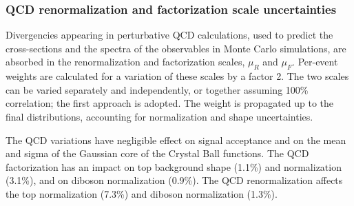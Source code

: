 \subsubsection{QCD renormalization and factorization scale uncertainties}

Divergencies appearing in perturbative QCD calculations, used to predict the cross-sections and the spectra of the observables in Monte Carlo simulations, are absorbed in the renormalization and factorization scales, $\mu_R$ and $\mu_F$. Per-event weights are calculated for a variation of these scales by a factor 2. The two scales can be varied separately and independently, or together assuming 100\% correlation; the first approach is adopted. The weight is propagated up to the final distributions, accounting for normalization and shape uncertainties.

\noindent The QCD variations have negligible effect on signal acceptance and on the mean and sigma of the Gaussian core of the Crystal Ball functions. The QCD factorization has an impact on top background shape (1.1\%) and normalization (3.1\%), and on diboson normalization (0.9\%). The QCD renormalization affects the top normalization (7.3\%) and diboson normalization (1.3\%).

